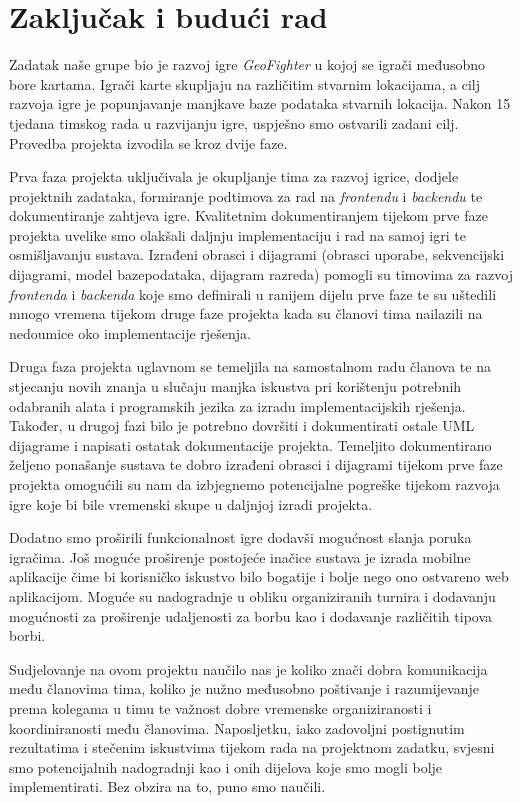 \chapter{Zaključak i budući rad}
		
		{Zadatak naše grupe bio je razvoj igre \textit{GeoFighter} u kojoj se igrači međusobno bore kartama. Igrači karte skupljaju na različitim stvarnim lokacijama, a cilj razvoja igre je popunjavanje manjkave baze podataka stvarnih lokacija. Nakon 15 tjedana timskog rada u razvijanju igre, uspješno smo ostvarili zadani cilj. Provedba projekta izvodila se kroz dvije faze.} 
		
		{Prva faza projekta uključivala je okupljanje tima za razvoj igrice, dodjele projektnih zadataka, formiranje podtimova za rad na \textit{frontendu} i \textit{backendu} te dokumentiranje zahtjeva igre. Kvalitetnim dokumentiranjem tijekom prve faze projekta uvelike smo olakšali daljnju implementaciju i rad na samoj igri te osmišljavanju sustava. Izrađeni obrasci i dijagrami (obrasci uporabe, sekvencijski dijagrami, model bazepodataka, dijagram razreda) pomogli su timovima za razvoj \textit{frontenda} i \textit{backenda} koje smo definirali u ranijem dijelu prve faze te su uštedili mnogo vremena tijekom druge faze projekta kada su članovi tima nailazili na nedoumice oko implementacije rješenja.}
			
		{Druga faza projekta uglavnom se temeljila na samostalnom radu članova te na stjecanju novih znanja u slučaju manjka iskustva pri korištenju potrebnih odabranih alata i programskih jezika za izradu implementacijskih rješenja. Također, u drugoj fazi bilo je potrebno dovršiti i dokumentirati ostale UML dijagrame i napisati ostatak dokumentacije projekta. Temeljito dokumentirano željeno ponašanje sustava te dobro izrađeni obrasci i dijagrami tijekom prve faze projekta omogućili su nam da izbjegnemo potencijalne pogreške tijekom razvoja igre koje bi bile vremenski skupe u daljnjoj izradi projekta.}
		
		{Dodatno smo proširili funkcionalnost igre dodavši mogućnost slanja poruka igračima. Još moguće proširenje postojeće inačice sustava je izrada mobilne aplikacije čime bi korisničko iskustvo bilo bogatije i bolje nego ono ostvareno web aplikacijom. Moguće su nadogradnje u obliku organiziranih turnira i dodavanju mogućnosti za proširenje udaljenosti za borbu kao i dodavanje različitih tipova borbi.}
		
		{Sudjelovanje na ovom projektu naučilo nas je koliko znači dobra komunikacija među članovima tima, koliko je nužno međusobno poštivanje i razumijevanje prema kolegama u timu te važnost dobre vremenske organiziranosti i koordiniranosti među članovima. Naposljetku, iako zadovoljni postignutim rezultatima i stečenim iskustvima tijekom rada na projektnom zadatku, svjesni smo potencijalnih nadogradnji kao i onih dijelova koje smo mogli bolje implementirati. Bez obzira na to, puno smo naučili.}\textsc{}
		
		\eject 